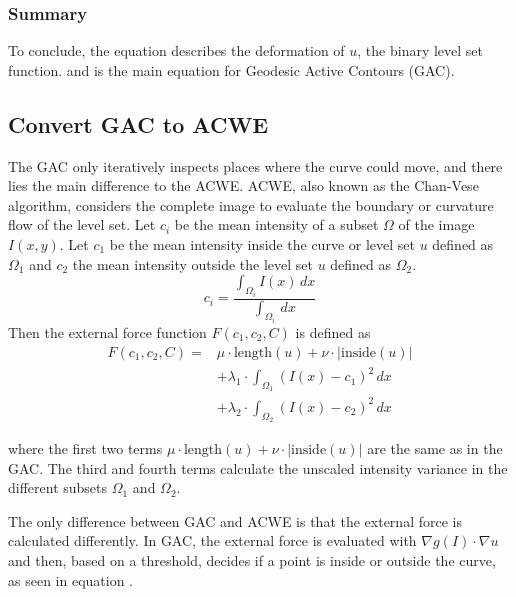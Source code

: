 \subsubsection{Summary}
To conclude, the equation  describes the deformation of $u$, the binary level set function. and is the main equation for Geodesic Active Contours (GAC). 

\subsection{Convert GAC to ACWE}
\label{sus:acwe_ransac}
The GAC only iteratively inspects places where the curve could move, and there lies the main difference to the ACWE. ACWE, also known as the Chan-Vese algorithm, considers the complete image to evaluate the boundary or curvature flow of the level set. 
Let $c_i$ be the mean intensity of a subset $\Omega$ of the image $I(x,y)$. Let $c_1$ be the mean intensity inside the curve or level set $u$ defined as $\Omega_1$ and $c_2$ the mean intensity outside the level set $u$ defined as $\Omega_2$. 
\begin{equation}
    c_{i}= \frac{ \int_{\Omega_{i}} I(x) \,dx}{\int_{\Omega_{i}} \, dx }
    \label{eq:meanintensity}
\end{equation}
Then the external force function $F(c_1,c_2,C)$ is defined as
\begin{equation}
    \begin{split}
    F(c_1, c_2, C) = & \mu \cdot \text{length}(u) + \nu \cdot |\text{inside}(u)| \\
    & + \lambda_1 \cdot \int_{\Omega_1} (I(x) - c_1)^2 \, dx \\
    & + \lambda_2 \cdot \int_{\Omega_2} (I(x) - c_2)^2 \, dx
    \end{split}
    \label{eq:curvatureflow}
    \end{equation}

where the first two terms $\mu \cdot \text{length}(u) + \nu \cdot |\text{inside}(u)|$ are the same as in the GAC. The third and fourth terms calculate the unscaled intensity variance in the different subsets $\Omega_1$ and $\Omega_2$. 

The only difference between GAC and ACWE is that the external force is calculated differently. In GAC, the external force is evaluated with $\nabla g(I) \cdot \nabla u$ and then, based on a threshold, decides if a point is inside or outside the curve, as seen in equation . 

